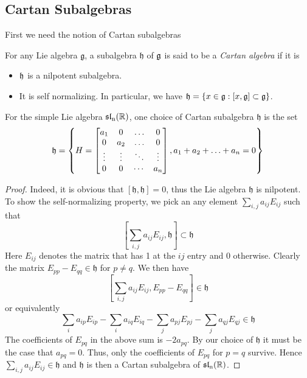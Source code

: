 \subsection{Cartan Subalgebras}
First we need the notion of Cartan subalgebras
\begin{definition}
    For any Lie algebra $\mathfrak{g}$, a subalgebra $\mathfrak{h}$ of $\operatorname{\mathfrak{g}}$ is said to be a \textit{Cartan algebra} if it is
    \begin{itemize}
        \item $\operatorname{\mathfrak{h}}$ is a nilpotent subalgebra.
        \item It is self normalizing. In particular, we have $\operatorname{\mathfrak{h}} = \left\lbrace x \in \operatorname{\mathfrak{g}} : [x,\operatorname{\mathfrak{g}}] \subset \operatorname{\mathfrak{g}}\right\rbrace$.
    \end{itemize}
\end{definition}
\begin{example}
    For the simple Lie algebra $\operatorname{\mathfrak{sl}_n(\mathbb{R})}$, one choice of  Cartan subalgebra $\mathfrak{h}$ is the set
\[\operatorname{\mathfrak{h}} = \left\lbrace H= \begin{bmatrix}
        a_1    & 0      & \ldots & 0      \\
        0      & a_2    & \ldots & 0      \\
        \vdots & \vdots & \ddots & \vdots \\
        0      & 0      & \cdots & a_n
    \end{bmatrix}, a_1 + a_2+ \ldots + a_n = 0\right\rbrace\]
\end{example}
\begin{proof}
    Indeed, it is obvious that $[\mathfrak{h},\mathfrak{h}]=0$, thus the Lie algebra $\mathfrak{h}$ is nilpotent. To show the 
    self-normalizing property, we pick an any element $\sum_{i,j}a_{ij}E_{ij}$ such that
    \[\left[\sum_{i,j}a_{ij}E_{ij},\mathfrak{h}\right]\subset \mathfrak{h}\]
    Here $E_{ij}$ denotes the matrix that has 1 at the $ij$ entry and 0 otherwise. Clearly the matrix
    $E_{pp}-E_{qq} \in \mathfrak{h}$ for $p \ne q$. We then have 
    \[\left[\sum_{i,j}a_{ij}E_{ij},E_{pp}-E_{qq}\right] \in \mathfrak{h}\]
    or equivalently
    \[\sum_{i}a_{ip}E_{ip}-\sum_{i}a_{iq}E_{iq}-\sum_j a_{pj}E_{pj}-\sum_j a_{qj}E_{qj} \in \mathfrak{h}\]
    The coefficients of $E_{pq}$ in the above sum is $-2a_{pq}$. By our choice of $\mathfrak{h}$ it must be the case that $a_{pq}=0$. Thus,
    only the coefficients of $E_{pq}$ for $p=q$ survive. Hence 
    $\sum_{i,j}a_{ij}E_{ij} \in \mathfrak{h}$  and $\mathfrak{h}$ is then a Cartan subalgebra of $\operatorname{\mathfrak{sl}_n(\mathbb{R})}$.
\end{proof}
